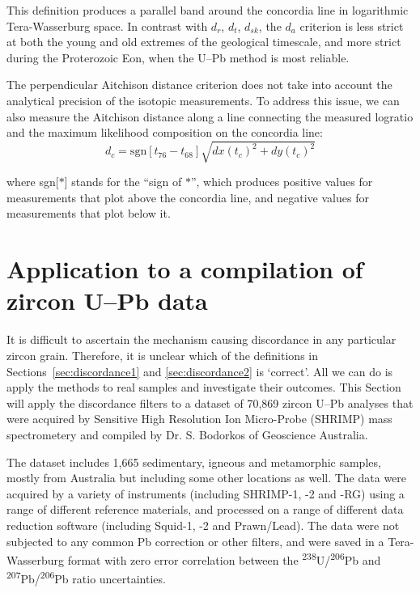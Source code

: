 \documentclass[gchron, manuscript]{copernicus}
\begin{document}
This definition produces a parallel band around the concordia line in
logarithmic Tera-Wasserburg space. In contrast with $d_r$, $d_t$,
$d_{sk}$, the $d_a$ criterion is less strict at both the young and old
extremes of the geological timescale, and more strict during the
Proterozoic Eon, when the U--Pb method is most reliable.

The perpendicular Aitchison distance criterion does not take into
account the analytical precision of the isotopic measurements.  To
address this issue, we can also measure the Aitchison distance along a
line connecting the measured logratio and the maximum likelihood
composition on the concordia line:
\begin{equation}
  d_c = \mbox{sgn}[t_{76}-t_{68}] \sqrt{ dx(t_c)^2 + dy(t_c)^2 }
  \label{eq:da}
\end{equation}

\noindent where sgn[$\ast$] stands for the ``sign of $\ast$'', which
produces positive values for measurements that plot above the
concordia line, and negative values for measurements that plot below
it.

\section{Application to a compilation of zircon U--Pb data}
\label{sec:application}

It is difficult to ascertain the mechanism causing discordance in any
particular zircon grain. Therefore, it is unclear which of the
definitions in Sections~\ref{sec:discordance1} and
\ref{sec:discordance2} is `correct'. All we can do is apply the
methods to real samples and investigate their outcomes. This Section
will apply the discordance filters to a dataset of 70,869 zircon U--Pb
analyses that were acquired by Sensitive High Resolution Ion
Micro-Probe (SHRIMP) mass spectrometery and compiled by Dr. S.
Bodorkos of Geoscience Australia.

The dataset includes 1,665 sedimentary, igneous and metamorphic
samples, mostly from Australia but including some other locations as
well.  The data were acquired by a variety of instruments (including
SHRIMP-1, -2 and -RG) using a range of different reference materials,
and processed on a range of different data reduction software
(including Squid-1, -2 and Prawn/Lead). The data were not subjected to
any common Pb correction or other filters, and were saved in a
Tera-Wasserburg format with zero error correlation between the
\textsuperscript{238}U/\textsuperscript{206}Pb and
\textsuperscript{207}Pb/\textsuperscript{206}Pb ratio uncertainties.
\end{document}
